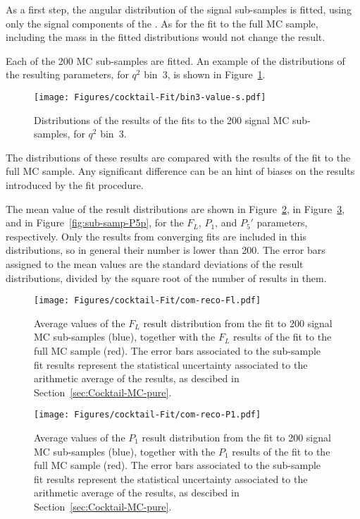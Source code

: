 As a first step, the angular distribution of the signal sub-samples is fitted, using only the signal components of the \pdf.
As for the fit to the full MC sample, including the mass in the fitted distributions would not change the result.

Each of the 200 MC sub-samples are fitted.
An example of the distributions of the resulting parameters, for $q^2$ bin~3, is shown in Figure~\ref{fig:closure-signal-cocktail-bin3}.

\begin{figure}[!hbt]
  \centering
  \texttt{[image: Figures/cocktail-Fit/bin3-value-s.pdf]}
  \caption{Distributions of the results of the fits to the 200 signal MC sub-samples, for $q^2$ bin~3.}
  \label{fig:closure-signal-cocktail-bin3}
\end{figure}

The distributions of these results are compared with the results of the fit to the full MC sample.
Any significant difference can be an hint of biases on the results introduced by the fit procedure.

The mean value of the result distributions are shown in Figure~\ref{fig:sub-samp-FL}, in Figure~\ref{fig:sub-samp-P1}, and in Figure~\ref{fig:sub-samp-P5p}, for the $F_L$, $P_1$, and $P_5'$ parameters, respectively.
Only the results from converging fits are included in this distributions, so in general their number is lower than 200.
The error bars assigned to the mean values are the standard deviations of the result distributions, divided by the square root of the number of results in them. 


\begin{figure}[!hbt]
  \centering
  \texttt{[image: Figures/cocktail-Fit/com-reco-Fl.pdf]}
  \caption{Average values of the $F_L$ result distribution from the fit to 200 signal MC sub-samples (blue), together with the $F_L$ results of the fit to the full MC sample (red). The error bars associated to the sub-sample fit results represent the statistical uncertainty associated to the arithmetic average of the results, as descibed in Section~\ref{sec:Cocktail-MC-pure}.}
  \label{fig:sub-samp-FL}
\end{figure}


\begin{figure}[!hbt]
  \centering
  \texttt{[image: Figures/cocktail-Fit/com-reco-P1.pdf]}
  \caption{Average values of the $P_1$ result distribution from the fit to 200 signal MC sub-samples (blue), together with the $P_1$ results of the fit to the full MC sample (red). The error bars associated to the sub-sample fit results represent the statistical uncertainty associated to the arithmetic average of the results, as descibed in Section~\ref{sec:Cocktail-MC-pure}.}
  \label{fig:sub-samp-P1}
\end{figure}

